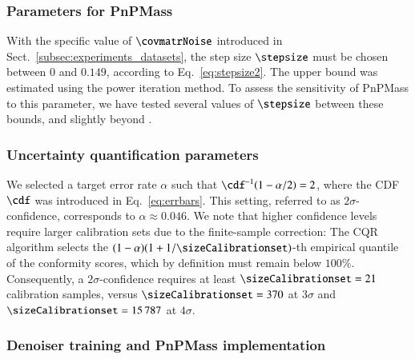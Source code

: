 \documentclass{aa}
\begin{document}
\subsubsection{Parameters for PnPMass}
\label{subsubsec:experiments_impl_pnpmass}

With the specific value of $\covmatrNoise$ introduced in Sect.~\ref{subsec:experiments_datasets}, the step size $\stepsize$ must be chosen between $0$ and $0.149$, according to Eq.~\eqref{eq:stepsize2}. The upper bound was estimated using the power iteration method. To assess the sensitivity of PnPMass to this parameter, we have tested several values of $\stepsize$ between these bounds, and slightly beyond .

\subsubsection{Uncertainty quantification parameters}
\label{subsubsec:experiments_impl_uq}

We selected a target error rate $\alpha$ such that $\cdf^{-1}\!\left(
    1 - \alpha/2
\right) = 2$, where the CDF $\cdf$ was introduced in Eq.~\eqref{eq:errbars}. This setting, referred to as $2\sigma$-confidence, corresponds to $\alpha \approx 0.046$. We note that higher confidence levels require larger calibration sets due to the finite-sample correction: The CQR algorithm selects the $(1 - \alpha)(1 + 1/\sizeCalibrationset)$-th empirical quantile of the conformity scores, which by definition must remain below $100\%$. Consequently, a $2\sigma$-confidence requires at least $\sizeCalibrationset = 21$ calibration samples, versus $\sizeCalibrationset = 370$ at $3\sigma$ and $\sizeCalibrationset = 15\,787$ at $4\sigma$.

\subsubsection{Denoiser training and PnPMass implementation}
\label{subsubsec:experiments_impl_training}
\end{document}
